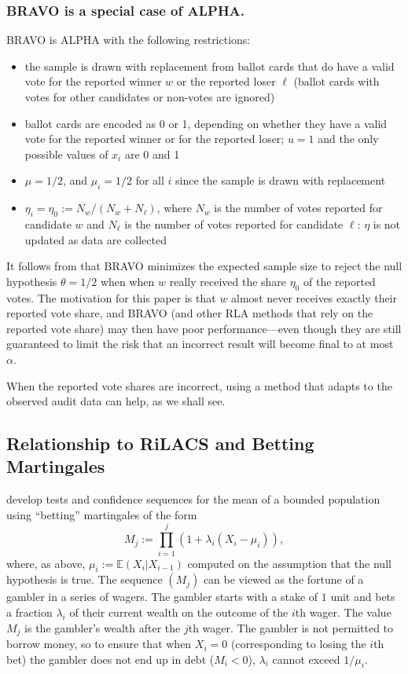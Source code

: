 \documentclass[12pt,runningheads]{llncs}
\newcommand{\EE}{\mathbb{E}}
\begin{document}
{\subsubsection{BRAVO is a special case of ALPHA.}
BRAVO is ALPHA with the following restrictions:
\begin{itemize}
    \item the sample is drawn with replacement from ballot cards that do have a valid vote for the reported winner 
    $w$ or the reported loser $\ell$ (ballot cards with votes for other candidates or non-votes are ignored)
    \item  ballot cards are encoded as 0 or 1, depending on whether they have a valid vote
    for the reported winner or for the reported loser;  $u=1$ and the only possible values of $x_i$ are 0 and 1
    \item $\mu = 1/2$, and $\mu_i = 1/2$ for all $i$ since the sample is drawn with replacement
    \item  $\eta_i = \eta_0 := N_w/(N_w+N_\ell)$, where $N_w$ is the number of votes reported for candidate $w$ 
and $N_\ell$ is the number of votes reported for candidate $\ell$: $\eta$ is not updated as data are collected
\end{itemize}
It follows from \cite{wald45} that BRAVO minimizes the expected 
sample size to reject the null hypothesis $\theta=1/2$ when when $w$ really received
the share $\eta_0$ of the reported votes.
The motivation for this paper is that $w$ almost never receives exactly their reported vote share, and
BRAVO (and other RLA methods that rely on the reported vote share) may then have poor performance---even
though they are still guaranteed to limit the risk that an incorrect result will become final to at most $\alpha$.

When the reported vote shares are incorrect, using a method that
adapts to the observed audit data can help, as we shall see.

\subsection{Relationship to RiLACS and Betting Martingales} \label{sec:rilacs}
\cite{waudby-smithRamdas21,waudby-smithEtal21} develop tests and
confidence sequences for the mean of a bounded population
using ``betting'' martingales of the form
\begin{equation} \label{eq:lambda-rilacs}
M_j := \prod_{i=1}^j (1 + \lambda_i (X_i- \mu_i)),
\end{equation}
where, as above, $\mu_i := \EE(X_i | X_{i-1})$ computed on the assumption that the null hypothesis is true.
The sequence $(M_j)$ can be viewed as the fortune of a gambler in a series of wagers.
The gambler starts with a stake of $1$ unit and bets a fraction $\lambda_i$ of their current wealth on the outcome
of the $i$th wager.
The value $M_j$ is the gambler's wealth after the $j$th wager.
The gambler is not permitted to borrow money, so to ensure that when $X_i = 0$ (corresponding to losing the $i$th bet)
the gambler does not end up in debt ($M_i < 0$), $\lambda_i$ cannot exceed $1/\mu_i$.

}
\end{document}
